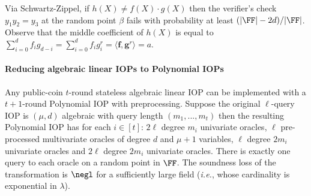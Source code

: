 Via Schwartz-Zippel, if $h(X) \neq f(X) \cdot g(X)$ then the verifier's check $y_1 y_2 = y_3$ at the random point $\beta$ fails with probability at least $(|\FF| - 2d)/|\FF|$. %
Observe that the middle coefficient of $h(X)$ is equal to $\sum_{i=0}^d f_i g_{d-i} = \sum_{i=0}^d f_i g^r_i = \langle \mathbf{f}, \mathbf{g}^r \rangle = a$.

\paragraph{Reducing algebraic linear IOPs to Polynomial IOPs} 
\label{sec:algebraicIOP}

\begin{theorem}\label{thm:algebraicIOPcompiler}
Any public-coin $t$-round stateless algebraic linear IOP can be implemented with a $t+1$-round Polynomial IOP with preprocessing. Suppose the original $\ell$-query IOP is $(\mu,d)$ algebraic with query length $(m_1,...,m_t)$ then the resulting Polynomial IOP has for each $i \in [t]$: $2\ell$ degree $m_i$ univariate oracles, $\ell$ pre-processed multivariate oracles of degree $d$ and $\mu+1$ variables, $\ell$ degree $2m_i$ univariate oracles %
and $2\ell$ degree $2m_i$ univariate oracles. %
There is exactly one query to each oracle on a random point in $\FF$. The soundness loss of the transformation is $\negl$ for a sufficiently large field (\emph{i.e.}, whose cardinality is exponential in $\lambda$).
\end{theorem}

